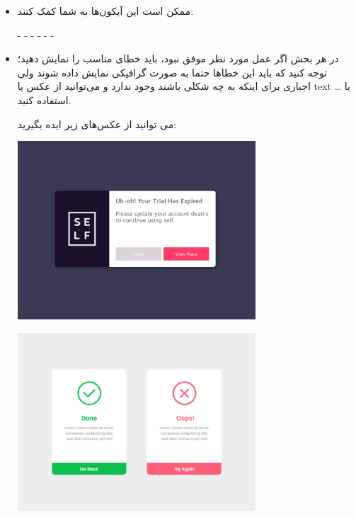 \documentclass[]{article}
\begin{document}
\begin{itemize}
\item

ممکن است این آیکون‌ها به شما کمک کنند:

\href{https://gamedeveloperstudio.itch.io/ui-icons}{\textcolor{blue}{\underline{}}}
 -
\href{https://www.kenney.nl/assets/game-icons}{\textcolor{blue}{\underline{}}}
   -
\href{https://www.kenney.nl/assets/ui-pack}{\textcolor{blue}{\underline{}}}
     -
      \href{http://vecteezy.com/vector-art/112447-preloader-ui-progress}{\textcolor{blue}{\underline{}}}
       -
       \href{https://www.vecteezy.com/vector-art/144976-set-of-coupon-sale-vectors}{\textcolor{blue}{\underline{}}}
       -
        \href{https://www.iconninja.com/tag/offer-icon}{\textcolor{blue}{\underline{}}}
         - 
         \href{https://www.iconninja.com/tag/add-icon}{\textcolor{blue}{\underline{}}}

\item

در هر بخش اگر عمل مورد نظر موفق نبود، باید خطای مناسب را نمایش دهید؛ توجه کنید که باید این خطاها حتما به صورت گرافیکی نمایش داده شوند ولی اجباری برای اینکه به چه شکلی باشند وجود ندارد و می‌توانید از عکس یا text یا … استفاده کنید.

می توانید از عکس‌های زیر ایده بگیرید:

\begin{center}
\includegraphics[width=0.7\textwidth]{images/image4.png}
\end{center}

\begin{center}
\includegraphics[width=0.7\textwidth]{images/image5.png}
\end{center}

\end{itemize}
\end{document}

